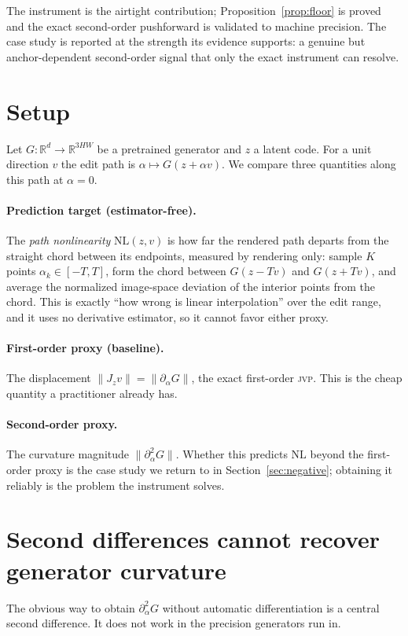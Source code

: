 \documentclass[10pt]{article}
\newcommand{\R}{\mathbb{R}}
\newcommand{\jvp}{\textsc{jvp}}
\begin{document}
The instrument is the airtight contribution; Proposition~\ref{prop:floor} is proved and the
exact second-order pushforward is validated to machine precision. The case study is reported
at the strength its evidence supports: a genuine but anchor-dependent second-order signal
that only the exact instrument can resolve.

\section{Setup}
\label{sec:setup}
Let $G:\R^{d}\to\R^{3HW}$ be a pretrained generator and $z$ a latent code. For a unit
direction $v$ the edit path is $\alpha\mapsto G(z+\alpha v)$. We compare three quantities along
this path at $\alpha=0$.

\paragraph{Prediction target (estimator-free).} The \emph{path nonlinearity} $\mathrm{NL}(z,v)$
is how far the rendered path departs from the straight chord between its endpoints, measured by
rendering only: sample $K$ points $\alpha_k\in[-T,T]$, form the chord between $G(z-Tv)$ and
$G(z+Tv)$, and average the normalized image-space deviation of the interior points from the
chord. This is exactly ``how wrong is linear interpolation'' over the edit range, and it uses
no derivative estimator, so it cannot favor either proxy.

\paragraph{First-order proxy (baseline).} The displacement $\lVert J_z v\rVert =
\lVert\partial_\alpha G\rVert$, the exact first-order \jvp{}. This is the cheap quantity a
practitioner already has.

\paragraph{Second-order proxy.} The curvature magnitude $\lVert\partial_\alpha^2 G\rVert$.
Whether this predicts $\mathrm{NL}$ beyond the first-order proxy is the case study we return
to in Section~\ref{sec:negative}; obtaining it reliably is the problem the instrument solves.

\section{Second differences cannot recover generator curvature}
\label{sec:fd}
The obvious way to obtain $\partial_\alpha^2 G$ without automatic differentiation is a central
second difference. It does not work in the precision generators run in.
\end{document}
